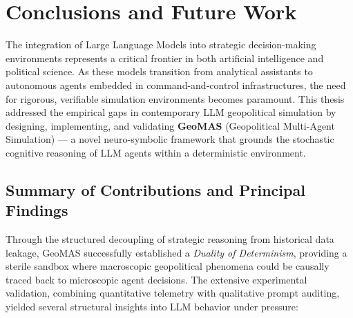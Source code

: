 \chapter{Conclusions and Future Work}
\label{chap:conclusions}

The integration of Large Language Models into strategic decision-making environments represents a critical frontier in both artificial intelligence and political science. As these models transition from analytical assistants to autonomous agents embedded in command-and-control infrastructures, the need for rigorous, verifiable simulation environments becomes paramount. This thesis addressed the empirical gaps in contemporary LLM geopolitical simulation by designing, implementing, and validating \textbf{GeoMAS} (Geopolitical Multi-Agent Simulation) — a novel neuro-symbolic framework that grounds the stochastic cognitive reasoning of LLM agents within a deterministic environment.

\section{Summary of Contributions and Principal Findings}
Through the structured decoupling of strategic reasoning from historical data leakage, GeoMAS successfully established a \textit{Duality of Determinism}, providing a sterile sandbox where macroscopic geopolitical phenomena could be causally traced back to microscopic agent decisions. The extensive experimental validation, combining quantitative telemetry with qualitative prompt auditing, yielded several structural insights into LLM behavior under pressure:

